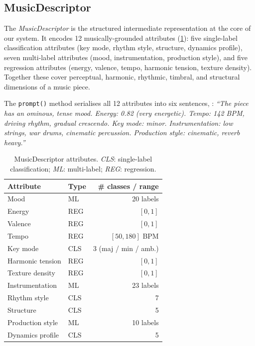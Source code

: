 \documentclass[10pt,twocolumn,letterpaper]{article}
\begin{document}
\subsection{MusicDescriptor}

The \emph{MusicDescriptor} is the structured intermediate representation at the
core of our system.
It encodes 12 musically-grounded attributes (\cref{tab:descriptor}):
five single-label classification attributes (key mode, rhythm style, structure,
dynamics profile), seven multi-label attributes (mood, instrumentation,
production style), and five regression attributes (energy, valence, tempo,
harmonic tension, texture density).
Together these cover perceptual, harmonic, rhythmic, timbral, and structural
dimensions of a music piece.

The \texttt{prompt()} method serialises all 12 attributes into six sentences,
\eg: \textit{``The piece has an ominous, tense mood. Energy: 0.82 (very
energetic). Tempo: 142 BPM, driving rhythm, gradual crescendo. Key mode:
minor. Instrumentation: low strings, war drums, cinematic percussion.
Production style: cinematic, reverb heavy.''}

\begin{table}[t]
\caption{MusicDescriptor attributes. \textit{CLS}: single-label
  classification; \textit{ML}: multi-label; \textit{REG}: regression.}
\label{tab:descriptor}
\centering\small
\begin{tabular}{@{}llr@{}}
\toprule
Attribute & Type & \# classes / range \\
\midrule
Mood              & ML  & 20 labels \\
Energy            & REG & $[0, 1]$ \\
Valence           & REG & $[0, 1]$ \\
Tempo             & REG & $[50, 180]$ BPM \\
Key mode          & CLS & 3 (maj / min / amb.) \\
Harmonic tension  & REG & $[0, 1]$ \\
Texture density   & REG & $[0, 1]$ \\
Instrumentation   & ML  & 23 labels \\
Rhythm style      & CLS & 7 \\
Structure         & CLS & 5 \\
Production style  & ML  & 10 labels \\
Dynamics profile  & CLS & 5 \\
\bottomrule
\end{tabular}
\end{table}
\end{document}
